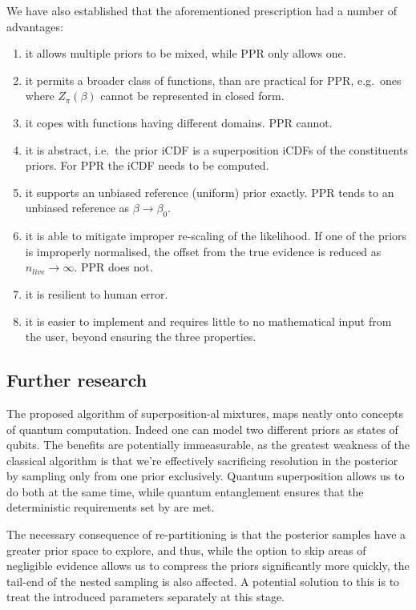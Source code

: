 \documentclass[usenatbib]{mnras}
\begin{document}
We have also established that the aforementioned prescription had a
number of advantages:
\begin{enumerate}
\item it allows multiple priors to be mixed, while PPR only allows
one.
\item it permits a broader class of functions, than are practical for
PPR, e.g.~ones where \(Z_{\pi}(\beta)\) cannot be represented in
closed form.
\item it copes with functions having different domains. PPR cannot.
\item it is abstract, i.e.~the prior iCDF is a superposition iCDFs of
the constituents priors. For PPR the iCDF needs to be computed.
\item it supports an unbiased reference (uniform) prior exactly. PPR
tends to an unbiased reference as \(\beta\rightarrow\beta_{0}\).
\item it is able to mitigate improper re-scaling of the likelihood. If
one of the priors is improperly normalised, the offset from the
true evidence is reduced as \(n_{live}\rightarrow\infty\). PPR
does not.
\item it is resilient to human error.
\item it is easier to implement and requires little to no mathematical
input from the user, beyond ensuring the three properties.
\end{enumerate}


\subsection{Further research}\label{sec:org8314ddf}
The proposed algorithm of superposition-al mixtures, maps neatly
onto concepts of quantum computation. Indeed one can model two
different priors as states of qubits. The benefits are potentially
immeasurable, as the greatest weakness of the classical algorithm
is that we're effectively sacrificing resolution in the posterior
by sampling only from one prior exclusively. Quantum superposition
allows us to do both at the same time, while quantum entanglement
ensures that the deterministic requirements set by
\citeauthor{Skilling2006} are met.

The necessary consequence of re-partitioning is that the posterior
samples have a greater prior space to explore, and thus, while the
option to skip areas of negligible evidence allows us to compress
the priors significantly more quickly, the tail-end of the nested
sampling is also affected. A potential solution to this is to treat
the introduced parameters separately at this stage.
\end{document}
